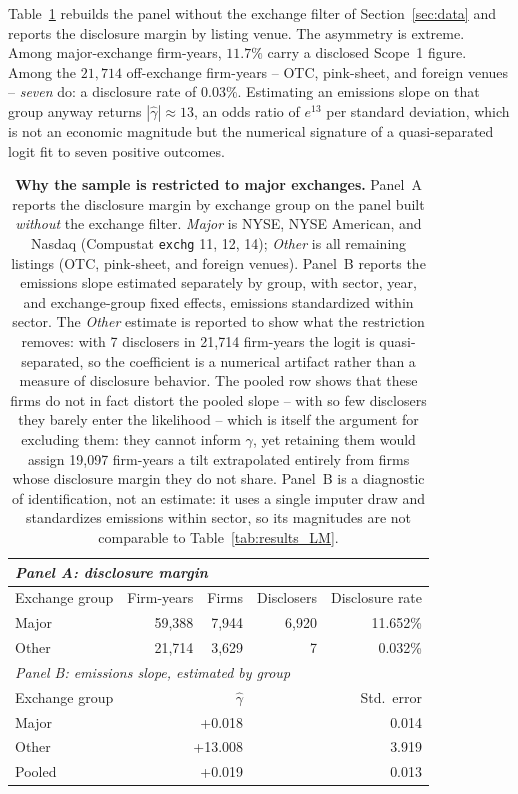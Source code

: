 \documentclass[a4paper,12pt]{article}
\begin{document}
Table~\ref{tab:diag_exchange} rebuilds the panel without the exchange filter of Section~\ref{sec:data} and reports the disclosure margin by listing venue. The asymmetry is extreme. Among major-exchange firm-years, $11.7\%$ carry a disclosed Scope~1 figure. Among the $21{,}714$ off-exchange firm-years -- OTC, pink-sheet, and foreign venues -- \emph{seven} do: a disclosure rate of $0.03\%$. Estimating an emissions slope on that group anyway returns $|\hat\gamma| \approx 13$, an odds ratio of $e^{13}$ per standard deviation, which is not an economic magnitude but the numerical signature of a quasi-separated logit fit to seven positive outcomes.

\begin{table}[htbp]
\small
\centering
\caption{\textbf{Why the sample is restricted to major exchanges.} Panel~A reports the
disclosure margin by exchange group on the panel built \emph{without} the exchange filter.
\emph{Major} is NYSE, NYSE American, and Nasdaq (Compustat \texttt{exchg} 11, 12, 14);
\emph{Other} is all remaining listings (OTC, pink-sheet, and foreign venues). Panel~B
reports the emissions slope estimated separately by group, with sector, year, and
exchange-group fixed effects, emissions standardized within sector. The \emph{Other}
estimate is reported to show what the restriction removes: with 7 disclosers in
21,714 firm-years the logit is quasi-separated, so the coefficient is a numerical
artifact rather than a measure of disclosure behavior. The pooled row shows that these
firms do not in fact distort the pooled slope -- with so few disclosers they barely enter
the likelihood -- which is itself the argument for excluding them: they cannot inform
$\gamma$, yet retaining them would assign 19{,}097 firm-years a tilt extrapolated entirely
from firms whose disclosure margin they do not share. Panel~B is a diagnostic of
identification, not an estimate: it uses a single imputer draw and standardizes emissions
within sector, so its magnitudes are not comparable to Table~\ref{tab:results_LM}.}
\label{tab:diag_exchange}
\begin{tabular}{lrrrr}
\toprule
\multicolumn{5}{l}{\emph{Panel A: disclosure margin}} \\
\midrule
Exchange group & Firm-years & Firms & Disclosers & Disclosure rate \\
\midrule
Major & 59,388 & 7,944 & 6,920 & 11.652\% \\
Other & 21,714 & 3,629 & 7 & 0.032\% \\
\midrule
\multicolumn{5}{l}{\emph{Panel B: emissions slope, estimated by group}} \\
\midrule
Exchange group & \multicolumn{2}{r}{$\hat\gamma$} & \multicolumn{2}{r}{Std.\ error} \\
\midrule
Major & \multicolumn{2}{r}{+0.018} & \multicolumn{2}{r}{0.014} \\
Other & \multicolumn{2}{r}{+13.008} & \multicolumn{2}{r}{3.919} \\
Pooled & \multicolumn{2}{r}{+0.019} & \multicolumn{2}{r}{0.013} \\
\bottomrule
\end{tabular}
\end{table}
\end{document}
